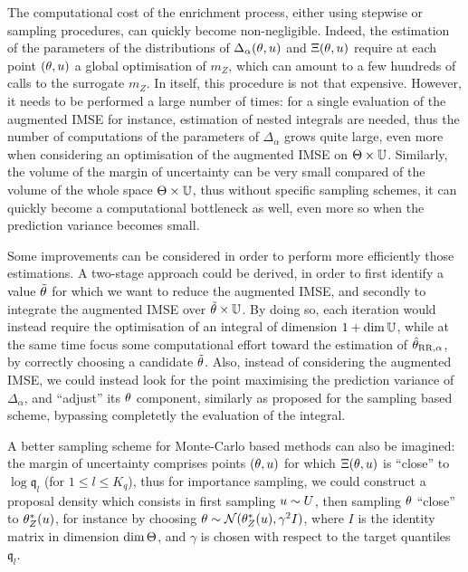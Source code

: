 \documentclass[../../Main_ManuscritThese.tex]{subfiles}
\begin{document}
The computational cost of the enrichment process, either using
stepwise or sampling procedures, can quickly become
non-negligible. Indeed, the estimation of the parameters of the
distributions of $\Delta_{\alpha}(\theta, u)$ and $\Xi(\theta, u)$
require at each point $(\theta, u)$ a global optimisation of $m_Z$,
which can amount to a few hundreds of calls to the surrogate $m_Z$.
In itself, this procedure is not that expensive. However, it needs to
be performed a large number of times: for a single evaluation of the
augmented IMSE for instance, estimation of nested integrals are
needed, thus the number of computations of the parameters of
$\Delta_{\alpha}$ grows quite large, even more when considering an
optimisation of the augmented IMSE on $\Theta
\times\mathbb{U}$. Similarly, the volume of the margin of uncertainty can
be very small compared of the volume of the whole space
$\Theta \times \mathbb{U}$, thus without specific sampling schemes, it
can quickly become a computational bottleneck as well, even more so
when the prediction variance becomes small.

Some improvements can be considered in order to perform more
efficiently those estimations. A two-stage approach could be derived,
in order to first identify a value $\tilde{\theta}$ for which we want to
reduce the augmented IMSE, and secondly to integrate the augmented
IMSE over $\tilde{\theta} \times \mathbb{U}$. By doing so, each iteration
would instead require the optimisation of an integral of dimension
$1 + \dim \mathbb{U}$, while at the same time focus some computational
effort toward the estimation of $\hat{\theta}_{\mathrm{RR},\alpha}$, by
correctly choosing a candidate $\tilde{\theta}$.  Also, instead of
considering the augmented IMSE, we could instead look for the point
maximising the prediction variance of $\Delta_{\alpha}$, and
``adjust'' its $\theta$ component, similarly as proposed for the sampling
based scheme, bypassing completetly the evaluation of the integral.



A better sampling scheme for Monte-Carlo based methods can also be
imagined: the margin of uncertainty comprises points $(\theta, u)$ for
which $\Xi(\theta,u)$ is ``close'' to $\log \mathfrak{q}_l$ (for
$1\leq l \leq K_q$), thus for importance sampling, we could construct
a proposal density which consists in first sampling $u \sim U$,
then sampling $\theta$ ``close'' to $\theta^*_Z(u)$, for instance by
choosing $\theta \sim \mathcal{N}(\theta^*_Z(u), \gamma^2 I)$, where $I$
is the identity matrix in dimension $\dim \Theta$, and $\gamma$ is
chosen with respect to the target quantiles $\mathfrak{q}_l$.
\end{document}
